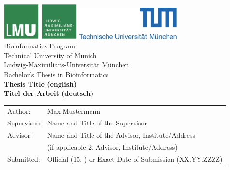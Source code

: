\documentclass[pdftex,12pt,a4paper]{report}
\begin{document}
\begin{titlepage}
    {\sffamily

        \begin{center}
            \includegraphics[width=0.3\textwidth]{logo2.png}
            \hfill
            \includegraphics[width=0.4\textwidth]{logo1.png}
            \\[3cm]

            {\Large Bioinformatics Program}\\[0.5cm]
            {\Large Technical University of Munich}\\[0.5cm]
            {\Large Ludwig-Maximilians-Universit\"at M\"unchen}\\[2cm]
            {\Large Bachelor's Thesis in Bioinformatics}\\[2cm]
            {\textbf{\LARGE Thesis Title (english)}}\\[2cm]
            {\textbf{\LARGE Titel der Arbeit (deutsch)}}\\[3cm]

        \end{center}

        \begin{center}\Large
            \begin{tabular}{ll}
                Author: & Max Mustermann    \\ Supervisor: & Name and Title of the Supervisor
                \\ Advisor: & Name and Title of the Advisor, Institute/Address \\
                        & (if applicable 2.
                Advisor, Institute/Address) \\ Submitted: & Official (15.
                   ) or Exact Date of Submission (XX.YY.ZZZZ)
            \end{tabular}
        \end{center}

    }%

\end{titlepage}

\end{document}
